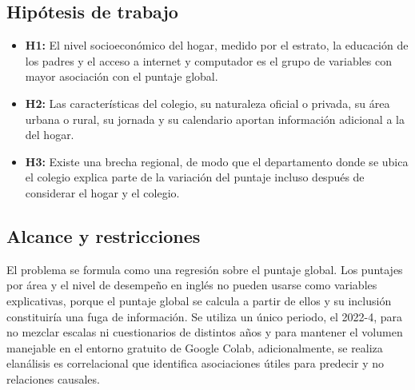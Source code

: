     \subsection{Hipótesis de trabajo}
        \begin{itemize}
            \item \textbf{H1:} El nivel socioeconómico del hogar, medido por el
            estrato, la educación de los padres y el acceso a internet y
            computador es el grupo de variables con mayor asociación con el
            puntaje global.

            \item \textbf{H2:} Las características del colegio, su naturaleza
            oficial o privada, su área urbana o rural, su jornada y su calendario
            aportan información adicional a la del hogar.

            \item \textbf{H3:} Existe una brecha regional, de modo que el
            departamento donde se ubica el colegio explica parte de la variación
            del puntaje incluso después de considerar el hogar y el colegio.
        \end{itemize}

    \subsection{Alcance y restricciones}
        El problema se formula como una regresión sobre el puntaje global. Los
        puntajes por área y el nivel de desempeño en inglés no pueden usarse como
        variables explicativas, porque el puntaje global se calcula a partir de
        ellos y su inclusión constituiría una fuga de información. Se utiliza un 
        único periodo, el 2022-4, para no mezclar escalas ni cuestionarios de 
        distintos años y para mantener el volumen manejable en el entorno gratuito 
        de Google Colab, adicionalmente, se realiza elanálisis es correlacional
        que identifica asociaciones útiles para predecir y no relaciones causales.
